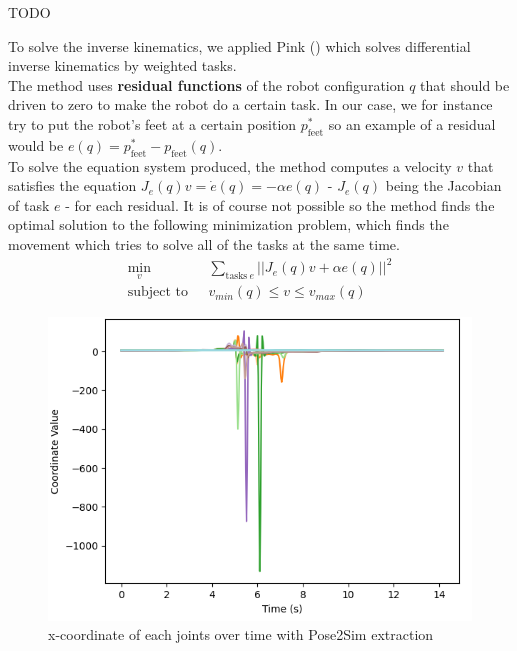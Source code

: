 \documentclass{amsart}
\theoremstyle{definition}
\theoremstyle{plain}
\begin{document}
TODO

To solve the inverse kinematics, we applied Pink (\cite{pink2024}) which solves differential inverse kinematics by weighted tasks. 
\\ 

The method uses \textbf{residual functions} of the robot configuration $q$ that should be driven to zero to make the robot do a certain task. In our case, we for instance try to put the robot's feet at a certain position $p_{\text{feet}}^*$ so an example of a residual would be $e(q) = p_{\text{feet}}^* - p_{\text{feet}}(q)$. 
\\

To solve the equation system produced, the method computes a velocity $v$ that satisfies the equation $J_e(q)v = \dot{e}(q) = -\alpha e(q)$ - $J_e(q)$ being the Jacobian of task $e$ - for each residual. 
It is of course not possible so the method finds the optimal solution to the following minimization problem, which finds the movement which tries to solve all of the tasks at the same time.
$$
\begin{aligned}
\min_v \ \ &\sum_{\text{tasks} \ e} ||J_e(q)v + \alpha e(q)||^2 \\
\text{subject to} \ \ \ &v_{min}(q) \leq v \leq v_{max}(q)
\end{aligned}
$$

\begin{figure}
  \includegraphics[width = 0.5 \columnwidth]{img/x_coord_pose2sim.png}
  \caption{x-coordinate of each joints over time with Pose2Sim extraction}
\end{figure}

\printbibliography
\end{document}

